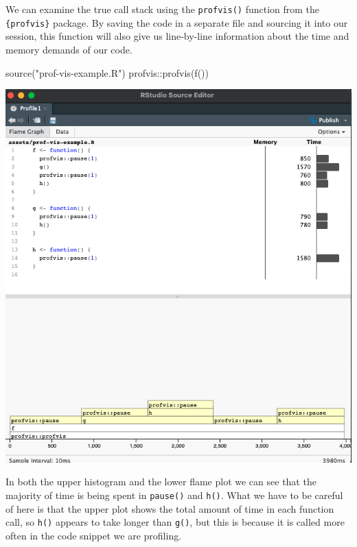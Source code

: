 \documentclass[
  letterpaper,
  DIV=11,
  numbers=noendperiod]{scrreprt}
\newenvironment{Shaded}{\begin{snugshade}}{\end{snugshade}}
\newcommand{\FunctionTok}[1]{\textcolor[rgb]{0.28,0.35,0.67}{#1}}
\newcommand{\NormalTok}[1]{\textcolor[rgb]{0.00,0.23,0.31}{#1}}
\newcommand{\SpecialCharTok}[1]{\textcolor[rgb]{0.37,0.37,0.37}{#1}}
\newcommand{\StringTok}[1]{\textcolor[rgb]{0.13,0.47,0.30}{#1}}
\begin{document}
We can examine the true call stack using the \texttt{profvis()} function
from the \texttt{\{profvis\}} package. By saving the code in a separate
file and sourcing it into our session, this function will also give us
line-by-line information about the time and memory demands of our code.

\begin{Shaded}
\begin{Highlighting}[]
\FunctionTok{source}\NormalTok{(}\StringTok{"prof{-}vis{-}example.R"}\NormalTok{)}
\NormalTok{profvis}\SpecialCharTok{::}\FunctionTok{profvis}\NormalTok{(}\FunctionTok{f}\NormalTok{())}
\end{Highlighting}
\end{Shaded}

\begin{center}
\includegraphics[width=1\textwidth,height=\textheight]{images/403-production-scalability/profiling-example-speed.png}
\end{center}

In both the upper histogram and the lower flame plot we can see that the
majority of time is being spent in \texttt{pause()} and \texttt{h()}.
What we have to be careful of here is that the upper plot shows the
total amount of time in each function call, so \texttt{h()} appears to
take longer than \texttt{g()}, but this is because it is called more
often in the code snippet we are profiling.
\end{document}
